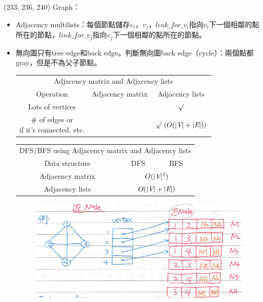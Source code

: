 \item \begin{theorem}{(233, 236, 240)} Graph：\begin{itemize}
        \item Adjacency multilists：每個節點儲存$v_i$，$v_j$，$link\_for\_v_i$指向$v_i$下一個相鄰的點所在的節點，$link\_for\_v_j$指向$v_j$下一個相鄰的點所在的節點。%
        \item 無向圖只有tree edge和back edge。判斷無向圖back edge（cycle）：兩個點都gray，但是不為父子節點。
        \begin{table}[H]
            \centering
            \begin{tabular}{|c|c|c|}
                \hline
                \multicolumn{3}{|c|}{Adjacency matrix and Adjacency lists} \\
                \Xhline{3\arrayrulewidth}
                Operation & Adjacency matrix & Adjacency lists \\
                \Xhline{2\arrayrulewidth}
                Lots of vertices & & $\surd$ \\
                \hline
                \makecell{\# of edges or \\if it's connected, etc.} & & $\surd \ (O(|\V| + |\E|))$ \\
                \hline
            \end{tabular}
        \end{table}
        \begin{table}[H]
            \centering
            \begin{tabular}{|c|c|c|}
                \hline
                \multicolumn{3}{|c|}{DFS/BFS using Adjacency matrix and Adjacency lists} \\
                \Xhline{3\arrayrulewidth}
                Data structure & DFS & BFS \\
                \Xhline{2\arrayrulewidth}
                Adjacency matrix & \multicolumn{2}{c|}{$O(|\textit{V}|^2)$} \\
                \hline
                Adjacency lists & \multicolumn{2}{c|}{$O(|\textit{V}| + |\textit{E}|)$} \\
                \hline
            \end{tabular}
        \end{table}
        \begin{figure}[H]
            \centering
            \includegraphics[scale=0.8]{img/adj_multilists.png}

\end{figure}
\end{itemize}
\end{theorem}
